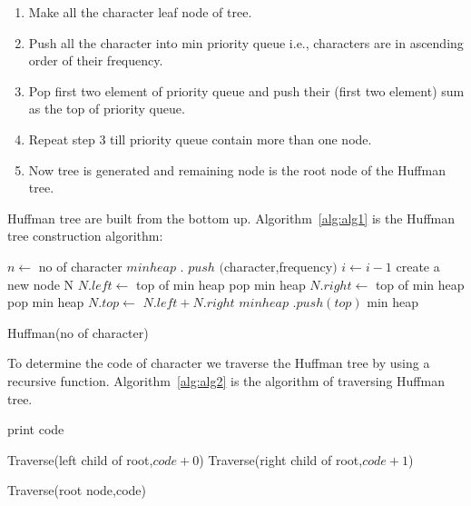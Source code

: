 \documentclass[conference]{IEEEtran}
\begin{document}
\begin{enumerate}
\label{list:e1}
\item Make all the character leaf node of tree.
\item Push all the character  into min priority queue i.e., characters are in ascending order of their frequency.
\item Pop first two element of priority queue and push their (first two element) sum as the top of priority queue.
\item Repeat step 3 till priority queue contain more than one  node.
\item Now tree is generated and remaining  node  is the root node of the Huffman tree.
\end{enumerate}
\vspace{.5cm}
Huffman tree are built from the bottom up\textsc{\cite{nelson1995data}}.
Algorithm~\ref{alg:alg1} is the Huffman tree construction algorithm:\textsc{\cite{cormen2009introduction}}
\begin{algorithm}[H]
\begin{algorithmic}
\STATE $n\gets$ no of character
 \STATE $min heap$ $.$ $push$ $($character,frequency$)$
 \STATE $i\gets i-1$
 \ENDFOR
 \STATE create a new node N
 \STATE $N.left\gets $ top of min heap
 \STATE pop min heap
 \STATE $N.right\gets$ top of min heap
  \STATE pop min heap
  \STATE $N.top\gets$ $ N.left+N.right$
  \STATE $min heap$ $.push(top)$
  \ENDWHILE
 \RETURN min heap
\end{algorithmic}
\caption{Huffman(no of character)}
\label{alg:alg1}
\end{algorithm}

To determine the code of character we traverse the Huffman tree by using a recursive function. Algorithm~\ref{alg:alg2} is the algorithm of traversing Huffman tree.

\begin{algorithm}[H]
\begin{algorithmic}
\RETURN 
\ENDIF
{}
\STATE print code
\ENDIF

\STATE Traverse(left child of root,$code+0$)
\STATE Traverse(right child of root,$code+1$)



\end{algorithmic}
\caption{Traverse(root node,code)}
\label{alg:alg2}
\end{algorithm}
\end{document}
